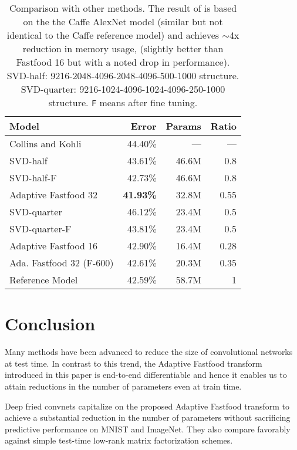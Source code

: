 \documentclass[10pt,twocolumn,letterpaper]{article}
\begin{document}
\begin{table}
  \centering
  \begin{tabular}{l|r|r|r}
    Model & Error & Params & Ratio \\
    \hline
    Collins and Kohli~\cite{Collins2014} & 44.40\% & --- & ---\\
    SVD-half & 43.61\% & 46.6M & 0.8 \\
    SVD-half-F & 42.73\% &  46.6M & 0.8 \\
    Adaptive Fastfood 32 & \textbf{41.93\%} & 32.8M & 0.55\\
    SVD-quarter&  46.12\% & 23.4M  & 0.5 \\
    SVD-quarter-F & 43.81\%  & 23.4M & 0.5 \\
    Adaptive Fastfood 16 & 42.90\% & 16.4M & 0.28 \\
    \hline
    Ada. Fastfood 32 (F-600) & 42.61\% & 20.3M & 0.35 \\
\hline
    Reference Model & 42.59\% & 58.7M & 1\\
  \end{tabular}
  \caption{Comparison with other methods.
    The result of \cite{Collins2014} is based on
    the the Caffe AlexNet model (similar but not identical to the Caffe reference
    model) and achieves $\sim$4x reduction in memory usage,
    (slightly better than Fastfood 16 but with a noted drop in performance).
    SVD-half: 9216-2048-4096-2048-4096-500-1000 structure.
    SVD-quarter: 9216-1024-4096-1024-4096-250-1000 structure.
    \texttt{F} means after fine tuning.}
\label{tab:imagenet_svd}
\end{table}




\section{Conclusion}

Many methods have been advanced to reduce the size of convolutional networks at test time. In contrast to this trend, the Adaptive Fastfood transform introduced in this paper is end-to-end differentiable and hence it enables us to attain reductions in the number of parameters even at train time.

Deep fried convnets capitalize on the proposed Adaptive Fastfood transform to achieve a substantial reduction in the number of parameters without sacrificing predictive performance on MNIST and ImageNet. They also compare favorably against simple test-time low-rank matrix factorization schemes.
\end{document}
